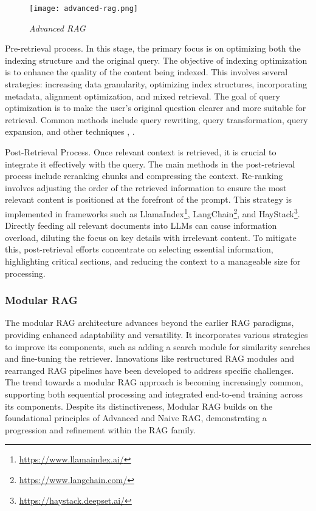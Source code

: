 \begin{figure}[H]
    \centering
    \texttt{[image: advanced-rag.png]}
    \caption{
        \it{Advanced RAG}
    }
    \label{fig:advanced-rag}
\end{figure}

Pre-retrieval process. In this stage, the primary focus is on optimizing both the indexing structure and the original query. The objective of indexing optimization is to enhance the quality of the content being indexed. This involves several strategies: increasing data granularity, optimizing index structures, incorporating metadata, alignment optimization, and mixed retrieval. The goal of query optimization is to make the user's original question clearer and more suitable for retrieval. Common methods include query rewriting, query transformation, query expansion, and other techniques \cite{ma2023query}, \cite{peng2024large} \cite{gao2022precise}.

Post-Retrieval Process. Once relevant context is retrieved, it is crucial to integrate it effectively with the query. The main methods in the post-retrieval process include reranking chunks and compressing the context. Re-ranking involves adjusting the order of the retrieved information to ensure the most relevant content is positioned at the forefront of the prompt. This strategy is implemented in frameworks such as LlamaIndex\footnote{\url{https://www.llamaindex.ai/}}, LangChain\footnote{\url{https://www.langchain.com/}}, and HayStack\footnote{\url{https://haystack.deepset.ai/}}. Directly feeding all relevant documents into LLMs can cause information overload, diluting the focus on key details with irrelevant content. To mitigate this, post-retrieval efforts concentrate on selecting essential information, highlighting critical sections, and reducing the context to a manageable size for processing.

\subsubsection*{Modular RAG}

The modular RAG architecture advances beyond the earlier RAG paradigms, providing enhanced adaptability and versatility. It incorporates various strategies to improve its components, such as adding a search module for similarity searches and fine-tuning the retriever. Innovations like restructured RAG modules \cite{yu2023generate} and rearranged RAG pipelines \cite{shao2023enhancing} have been developed to address specific challenges. The trend towards a modular RAG approach is becoming increasingly common, supporting both sequential processing and integrated end-to-end training across its components. Despite its distinctiveness, Modular RAG builds on the foundational principles of Advanced and Naive RAG, demonstrating a progression and refinement within the RAG family.

